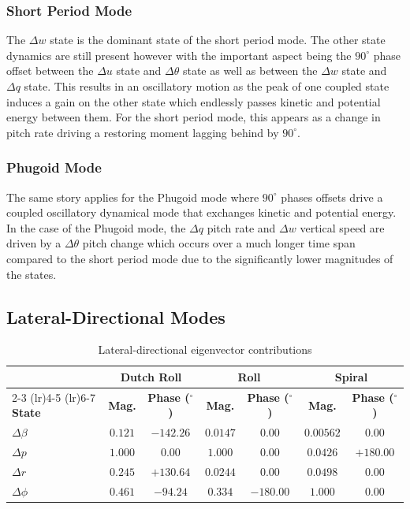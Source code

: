 \documentclass[11pt]{article}
\begin{document}
\subsubsection*{Short Period Mode}

The $\Delta w$ state is the dominant state of the short period mode.
The other state dynamics are still present however with the important aspect being the $90^{\circ}$ phase offset between
the $\Delta u$ state and $\Delta \theta$ state as well as between the $\Delta w$ state and $\Delta q$ state.
This results in an oscillatory motion as the peak of one coupled state induces a gain on the other state which endlessly
passes kinetic and potential energy between them.
For the short period mode, this appears as a change in pitch rate driving a restoring moment lagging behind by $90^\circ$.

\subsubsection*{Phugoid Mode}

The same story applies for the Phugoid mode where $90^\circ$ phases offsets drive a coupled oscillatory dynamical mode
that exchanges kinetic and potential energy.
In the case of the Phugoid mode, the $\Delta q$ pitch rate and $\Delta w$ vertical speed are driven by a $\Delta \theta$
pitch change which occurs over a much longer time span compared to the short period mode due to the significantly lower
magnitudes of the states.

\subsection{Lateral-Directional Modes}

\begin{table}[h]\label{tab:table_8}
\centering
\caption{Lateral-directional eigenvector contributions}
\begin{tabular}{l cc cc cc}
\toprule
& \multicolumn{2}{c}{\textbf{Dutch Roll}} & \multicolumn{2}{c}{\textbf{Roll}} & \multicolumn{2}{c}{\textbf{Spiral}} \\
\cmidrule(lr){2-3} \cmidrule(lr){4-5} \cmidrule(lr){6-7}
\textbf{State} & \textbf{Mag.} & \textbf{Phase ($^\circ$)} & \textbf{Mag.} & \textbf{Phase ($^\circ$)} & \textbf{Mag.} & \textbf{Phase ($^\circ$)} \\
\midrule
$\Delta\beta$ & $0.121$ & $-142.26$ & $0.0147$ & $0.00$   & $0.00562$ & $0.00$    \\
$\Delta p$    & $1.000$ & $0.00$    & $1.000$  & $0.00$   & $0.0426$  & $+180.00$ \\
$\Delta r$    & $0.245$ & $+130.64$ & $0.0244$ & $0.00$   & $0.0498$  & $0.00$    \\
$\Delta\phi$  & $0.461$ & $-94.24$  & $0.334$  & $-180.00$ & $1.000$  & $0.00$    \\
\bottomrule
\end{tabular}
\end{table}
\end{document}

